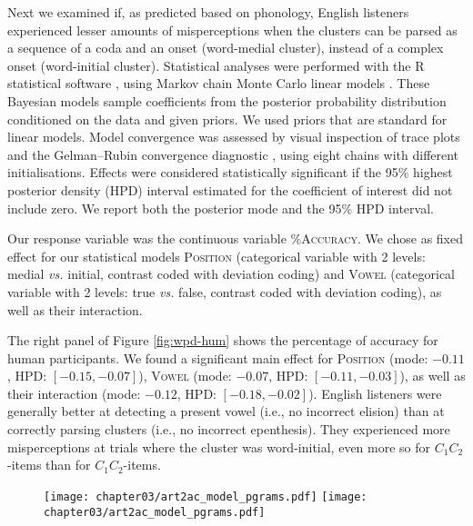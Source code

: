 {  Next we examined if, as predicted based on phonology, English listeners experienced lesser amounts of misperceptions when the clusters can be parsed as a sequence of a coda and an onset (word-medial cluster), instead of a complex onset (word-initial cluster). 
Statistical analyses were performed with the R statistical software \cite{R-base}, using Markov chain Monte Carlo linear models \cite{R-MCMCglmm, R-coda}. These Bayesian models sample coefficients from the posterior probability distribution conditioned on the data and given priors. We used priors that are standard for linear models. Model convergence was assessed by visual inspection of trace plots and the Gelman–Rubin convergence diagnostic \cite{gelman1992}, using eight chains with different initialisations. Effects were considered statistically significant if the 95\% highest posterior density (HPD) interval estimated for the coefficient of interest did not include zero. We report both the posterior mode and the 95\% HPD interval.  

Our response variable was the continuous variable \textsc{\%Accuracy}.
We chose as fixed effect for our statistical models \textsc{Position} (categorical variable with 2 levels: medial \textit{vs.} initial, contrast coded with deviation coding) and \textsc{Vowel} (categorical variable with 2 levels: true \textit{vs.} false, contrast coded with deviation coding), as well as their interaction.

The right panel of Figure \ref{fig:wpd-hum} shows the percentage of accuracy for human participants. We found a significant main effect for \textsc{Position} (mode: $-0.11$, HPD: $[-0.15, -0.07]$), \textsc{Vowel} (mode: $-0.07$, HPD: $[-0.11, -0.03]$), as well as their interaction (mode: $-0.12$, HPD: $[-0.18, -0.02]$). English listeners were generally better at detecting a present vowel (i.e., no incorrect elision) than at correctly parsing clusters (i.e., no incorrect epenthesis). They experienced more misperceptions at trials where the cluster was word-initial, even more so for $C_{1}C_{2}$-items than for $C_{1}$\textipa{[@]}$C_{2}$-items. %

\begin{figure}[htb!]
    \centering
    \texttt{[image: chapter03/art2ac\_model\_pgrams.pdf]}%
    \hspace{0.5cm}
    \texttt{[image: chapter03/art2ac\_model\_pgrams.pdf]}


\end{figure}}
